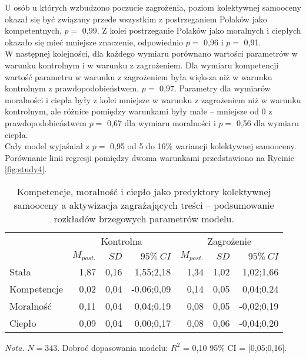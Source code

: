 \documentclass[man]{apa6}
\begin{document}
U osób u których wzbudzono poczucie zagrożenia, poziom kolektywnej samooceny okazał się być związany przede wszystkim z postrzeganiem Polaków jako kompetentnych, $p =$ 0,99. Z kolei postrzeganie Polaków jako moralnych i ciepłych okazało się mieć mniejsze znaczenie, odpowiednio $p =$ 0,96 i $p =$ 0,91.\\

W następnej kolejności, dla każdego wymiaru porównano wartości parametrów w warunku kontrolnym i w warunku z zagrożeniem. Dla wymiaru kompetencji wartość parametru w warunku z zagrożeniem była większa niż w warunku kontrolnym z prawdopodobieństwem, $p =$ 0,97. Parametry dla wymiarów moralności i ciepła były z kolei mniejsze w warunku z zagrożeniem niż w warunku kontrolnym, ale różnice pomiędzy warunkami były małe -- mniejsze od 0 z prawdopodobieństwem $p = $ 0,67 dla wymiaru moralności i $p =$ 0,56 dla wymiaru ciepła.\\

Cały model wyjaśniał z $p =$ 0,95 od 5 do 16\% wariancji kolektywnej samooceny. Porównanie linii regresji pomiędzy dwoma warunkami przedstawiono na Rycinie \ref{fig:study4}.\\

\begin{table*}[htbp]
\vspace*{2em}
\centering
\begin{threeparttable}
\caption{Kompetencje, moralność i ciepło jako predyktory kolektywnej samooceny a aktywizacja zagrażających treści -- podsumowanie rozkładów brzegowych parametrów modelu.}
\label{tab:4}
\begin{tabular}{lrrrrrr}

\midrule
 &
\multicolumn{3}{c}{Kontrolna} &
\multicolumn{3}{c}{Zagrożenie} \\
\cline{2-7}
 & $M_{post.}$    & $SD$   & $95\%\ CI$   & $M_{post.}$    & $SD$   & $95\%\ CI$  \\
\midrule
 Stała       &  1,87 & 0,16 &  1,55;2,18 &  1,34 & 1,02 &  1,02;1,66 \\
 Kompetencje &  0,02 & 0,04 & -0,06;0,09 &  0,14 & 0,05 &  0,04;0,24 \\
 Moralność   &  0,11 & 0,04 &  0,04;0.19 &  0,08 & 0,05 & -0,02;0,19 \\
 Ciepło      &  0,09 & 0,04 &  0,00;0,17 &  0,08 & 0,06 & -0,04;0,20 \\
\bottomrule
\end{tabular}
\begin{tablenotes}
{\small
\textit{Nota.} $N = 343$. Dobroć dopasowania modelu: $R^2$ = 0,10 95\% CI = [0,05;0,16].
}
\end{tablenotes}
\end{threeparttable}
\end{table*}
\end{document}
